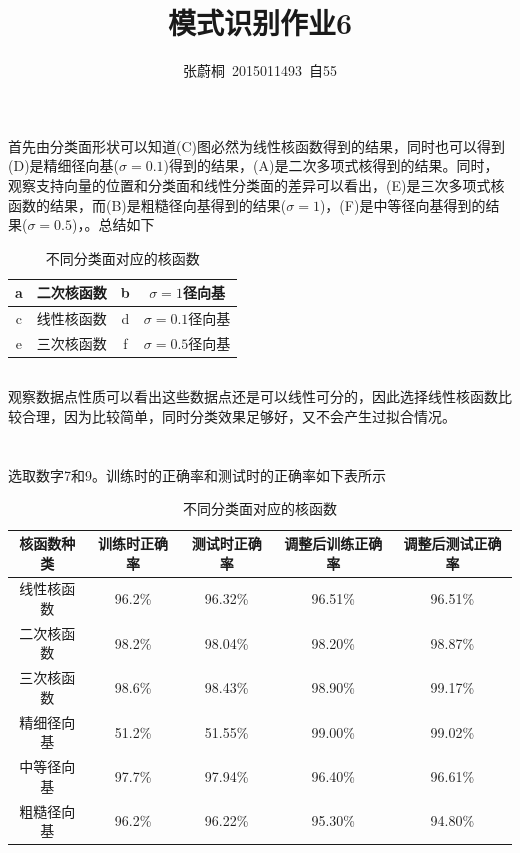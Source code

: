 \documentclass[UTF8,a4paper]{ctexart}
\title{模式识别作业6}
\author{张蔚桐\ 2015011493\ 自55}
\begin{document}
\maketitle
\section{}
\subsection{}
首先由分类面形状可以知道(C)图必然为线性核函数得到的结果，同时也可以得到(D)是精细径向基($\sigma=0.1$)得到的结果，(A)是二次多项式核得到的结果。同时，观察支持向量的位置和分类面和线性分类面的差异可以看出，(E)是三次多项式核函数的结果，而(B)是粗糙径向基得到的结果($\sigma=1$)，(F)是中等径向基得到的结果($\sigma=0.5$)，。总结如下

\begin{table}
\caption{不同分类面对应的核函数}
\centering
\begin{tabular}{|c|c|c|c|}
\hline
a &二次核函数& b &$\sigma=1$径向基 \\
\hline
c &线性核函数& d &$\sigma=0.1$径向基\\
\hline
e &三次核函数& f &$\sigma=0.5$径向基 \\
\hline
\end{tabular}
\end{table}
\subsection{}
观察数据点性质可以看出这些数据点还是可以线性可分的，因此选择线性核函数比较合理，因为比较简单，同时分类效果足够好，又不会产生过拟合情况。
\section{}
选取数字7和9。训练时的正确率和测试时的正确率如下表所示
\begin{table}
\caption{不同分类面对应的核函数}
\centering
\begin{tabular}{|c|c|c|c|c|}
\hline
核函数种类&训练时正确率&测试时正确率&调整后训练正确率&调整后测试正确率\\
\hline
线性核函数&96.2\%&96.32\%&96.51\%&96.51\%\\
\hline
二次核函数&98.2\%&98.04\%&98.20\%&98.87\%\\
\hline
三次核函数&98.6\%&98.43\%&98.90\%&99.17\%\\
\hline
精细径向基&51.2\%&51.55\%&99.00\%&99.02\%\\
\hline
中等径向基&97.7\%&97.94\%&96.40\%&96.61\%\\
\hline
粗糙径向基&96.2\%&96.22\%&95.30\%&94.80\%\\
\hline
\end{tabular}
\end{table}
\end{document}
